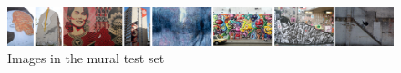 \documentclass[conference]{IEEEtran}
\begin{document}
\begin{figure}
	\centering
	\includegraphics[width=\textwidth]{images/murals}
	\caption{Images in the mural test set}
	\label{fig:murals}
\end{figure}


\end{document}
